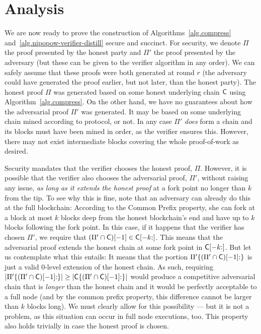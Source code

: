 \section{Analysis}

We are now ready to prove the construction of Algorithms~\ref{alg.compress}
and~\ref{alg.nipopow-verifier-distill}
secure
and succinct. For security, we denote $\Pi$ the proof presented by the honest party
and $\Pi'$ the proof presented by the adversary (but these can be given to the verifier
algorithm in any order). We can safely assume that these proofs were both generated
at round $r$ (the adversary could have generated the proof earlier, but not later,
than the honest party). The honest proof $\Pi$ was generated based on some honest
underlying chain $\mathsf{C}$ using Algorithm~\ref{alg.compress}. On the other hand,
we have no guarantees about how the adversarial proof $\Pi'$ was generated. It
may be based on some underlying chain mined according to protocol, or not. In any
case $\Pi'$ \emph{does} form a chain and its blocks must have been mined in order, as
the verifier ensures this. However, there may not exist intermediate blocks covering
the whole proof-of-work as desired.

Security mandates that the verifier chooses the honest proof, $\Pi$. However, it
is possible that the verifier also chooses the adversarial proof, $\Pi'$, without
raising any issue, \emph{as long as it extends the honest proof} at a fork point
no longer than $k$ from the tip. To see why this is fine, note that an adversary
can already do this at the full blockchain: According to the Common Prefix property,
she can fork at a block at most $k$ blocks deep from the honest blockchain's end
and have up to $k$ blocks following the fork point. In this case, if it happens
that the verifier has chosen $\Pi'$, we require that
$(\Pi' \cap \mathsf{C})[-1] \in \mathsf{C}[-k{:}]$. This means that the adversarial
proof extends the honest chain at some fork point in $\mathsf{C}[-k{:}]$. But
let us contemplate what this entails: It means that the portion
$\Pi'\{(\Pi' \cap \mathsf{C})[-1]{:}\}$ is just a valid $0$-level extension of the
honest chain. As such, requiring
$|\Pi'\{(\Pi' \cap \mathsf{C})[-1]{:}\}| \geq
	 |\mathsf{C}\{(\Pi' \cap \mathsf{C})[-1]{:}\}|$
would produce a competitive adversarial chain that is \emph{longer} than the
honest chain and it would be perfectly acceptable to a full node
(and by the common prefix property, this difference cannot be larger than $k$
blocks long). We must clearly allow for this possibility --- but it is not
a problem, as this situation can occur in full node executions, too.
This property also holds trivially in case the honest proof is chosen.


